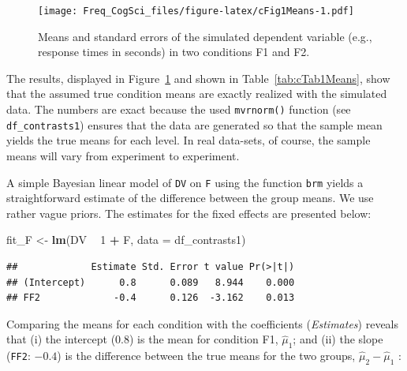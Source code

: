 \documentclass[12pt,]{krantz}
\newenvironment{Shaded}{\begin{snugshade}}{\end{snugshade}}
\newcommand{\DataTypeTok}[1]{\textcolor[rgb]{0.13,0.29,0.53}{#1}}
\newcommand{\DecValTok}[1]{\textcolor[rgb]{0.00,0.00,0.81}{#1}}
\newcommand{\KeywordTok}[1]{\textcolor[rgb]{0.13,0.29,0.53}{\textbf{#1}}}
\newcommand{\NormalTok}[1]{#1}
\newcommand{\OperatorTok}[1]{\textcolor[rgb]{0.81,0.36,0.00}{\textbf{#1}}}
\newcommand{\StringTok}[1]{\textcolor[rgb]{0.31,0.60,0.02}{#1}}
\begin{document}
\begin{figure}
\centering
\texttt{[image: Freq\_CogSci\_files/figure-latex/cFig1Means-1.pdf]}
\caption{\label{fig:cFig1Means}Means and standard errors of the simulated dependent variable (e.g., response times in seconds) in two conditions F1 and F2.}
\end{figure}

The results, displayed in Figure~\ref{fig:cFig1Means} and shown in Table~\ref{tab:cTab1Means}, show that the assumed true condition means are exactly realized with the simulated data. The numbers are exact because the used \texttt{mvrnorm()} function (see \texttt{df\_contrasts1}) ensures that the data are generated so that the sample mean yields the true means for each level. In real data-sets, of course, the sample means will vary from experiment to experiment.

A simple Bayesian linear model of \texttt{DV} on \texttt{F} using the function \texttt{brm} yields a straightforward estimate of the difference between the group means. We use rather vague priors. The estimates for the fixed effects are presented below:

\begin{Shaded}
\begin{Highlighting}[]
\NormalTok{fit_F <-}\StringTok{ }\KeywordTok{lm}\NormalTok{(DV }\OperatorTok{~}\StringTok{ }\DecValTok{1} \OperatorTok{+}\StringTok{ }\NormalTok{F,}
                 \DataTypeTok{data =}\NormalTok{ df_contrasts1) }
\end{Highlighting}
\end{Shaded}

\begin{Shaded}
\end{Shaded}

\begin{verbatim}
##             Estimate Std. Error t value Pr(>|t|)
## (Intercept)      0.8      0.089   8.944    0.000
## FF2             -0.4      0.126  -3.162    0.013
\end{verbatim}

Comparing the means for each condition with the coefficients (\emph{Estimates}) reveals that (i) the intercept (\(0.8\)) is the mean for condition F1, \(\hat\mu_1\); and (ii) the slope (\texttt{FF2}: \(-0.4\)) is the difference between the true means for the two groups, \(\hat\mu_2 - \hat\mu_1\) \citep{Bolker2018}:
\end{document}
